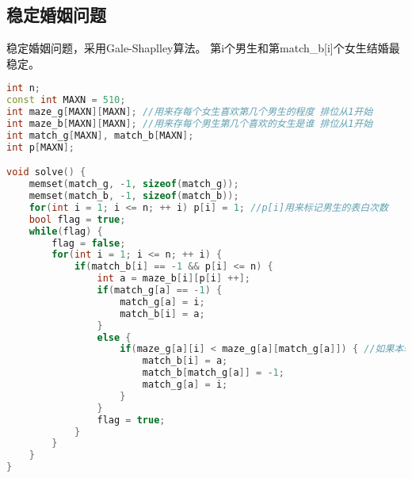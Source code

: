 \subsection{稳定婚姻问题}
稳定婚姻问题，采用Gale-Shaplley算法。
第i个男生和第match\_b[i]个女生结婚最稳定。
    \begin{lstlisting}[language=c++]
int n;
const int MAXN = 510;
int maze_g[MAXN][MAXN]; //用来存每个女生喜欢第几个男生的程度 排位从1开始
int maze_b[MAXN][MAXN]; //用来存每个男生第几个喜欢的女生是谁 排位从1开始
int match_g[MAXN], match_b[MAXN];
int p[MAXN];

void solve() {
    memset(match_g, -1, sizeof(match_g));
    memset(match_b, -1, sizeof(match_b));
    for(int i = 1; i <= n; ++ i) p[i] = 1; //p[i]用来标记男生的表白次数
    bool flag = true;
    while(flag) {
        flag = false;
        for(int i = 1; i <= n; ++ i) {
            if(match_b[i] == -1 && p[i] <= n) {
                int a = maze_b[i][p[i] ++];
                if(match_g[a] == -1) {
                    match_g[a] = i;
                    match_b[i] = a;
                }
                else {
                    if(maze_g[a][i] < maze_g[a][match_g[a]]) { //如果本轮男生更优秀则选择本轮男生
                        match_b[i] = a;
                        match_b[match_g[a]] = -1;
                        match_g[a] = i;
                    }
                }
                flag = true;
            }
        }
    }
}
    \end{lstlisting}
